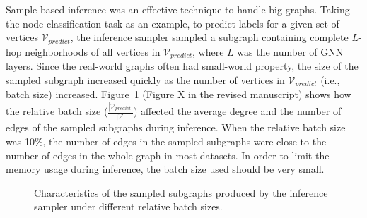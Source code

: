 Sample-based inference was an effective technique to handle big graphs.
%
Taking the node classification task as an example, to predict labels for a given set of vertices $\mathcal{V}_{predict}$, the inference sampler sampled a subgraph containing complete $L$-hop neighborhoods of all vertices in $\mathcal{V}_{predict}$, where $L$ was the number of GNN layers.
%
Since the real-world graphs often had small-world property, the size of the sampled subgraph increased quickly as the number of vertices in $\mathcal{V}_{predict}$ (i.e., batch size) increased.
%
Figure~\ref{fig:sampled_graph_size} (Figure X in the revised manuscript) shows how the relative batch size ($\frac{|\mathcal{V}_{predict}|}{|\mathcal{V}|}$) affected the average degree and the number of edges of the sampled subgraphs during inference.
%
When the relative batch size was 10\%, the number of edges in the sampled subgraphs were close to the number of edges in the whole graph in most datasets.
%
In order to limit the memory usage during inference, the batch size used should be very small.

\begin{figure}[H]
   \centering
   
   \caption{Characteristics of the sampled subgraphs produced by the inference sampler under different relative batch sizes.}
   \label{fig:sampled_graph_size}
\end{figure}

